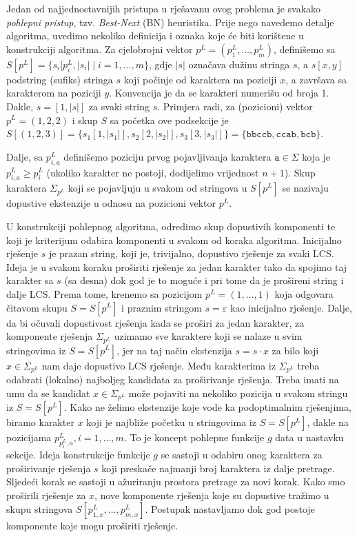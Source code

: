 \documentclass[a4paper, utf8, 11pt, colorlinks]{article}
\begin{document}
Jedan od najjednostavnijih pristupa u rješavanu ovog problema je svakako \emph{pohlepni pristup}, tzv. \emph{Best-Next} (BN) heuristika. Prije nego navedemo detalje algoritma, uvedimo nekoliko definicija i oznaka koje će biti korištene u konstrukciji algoritma. Za cjelobrojni vektor $p^L = (p^L_1,\ldots, p^L_m)$, definišemo sa
$S[p^L] = \{s_i[p^L_i, |s_i| \mid i=1,\ldots,m\}$, gdje $|s|$ označava dužinu stringa $s$, a $s[x,y]$ podstring (sufiks) stringa $s$ koji počinje od karaktera na poziciji $x$, a završava sa karakterom na poziciji $y$. Konvencija je da se karakteri numerišu od broja 1. Dakle, $s= [1, |s|]$ za svaki string $s$. Primjera radi, za (pozicioni) vektor $p^L=(1,2,2)$ i skup $S$ sa početka ove podsekcije je $S[ (1,2,3)] = \{ s_1[1, |s_1|], s_2[2, |s_2|], s_3[3, |s_3|]  \}= \{ \texttt{bbccb}, \texttt{ccab}, \texttt{bcb}\}$. 
 
Dalje, sa $p^L_{i,a}$ definišemo poziciju prvog pojavljivanja karaktera $\texttt{a}\in \Sigma$ koja je  $p^L_{i,a} \geq p^L_i$ (ukoliko karakter ne postoji, dodijelimo vrijednost $n+1$). Skup karaktera $\Sigma_{p^L}$ koji se pojavljuju u svakom od stringova u $S[p^L]$ se nazivaju dopustive ekstenzije u odnosu na pozicioni vektor $p^L$. 

U konstrukciji pohlepnog algoritma, odredimo  skup dopustivih komponenti te koji je kriterijum odabira komponenti u svakom od koraka algoritma. Inicijalno rješenje $s$ je prazan string, koji je, trivijalno, dopustivo rješenje za svaki LCS. Ideja je u svakom koraku proširiti rješenje za jedan karakter tako da spojimo taj karakter sa $s$ (sa desna) dok god je to moguće i pri tome da je prošireni string i dalje LCS. Prema tome, krenemo sa pozicijom $p^L = (1, \ldots, 1)$ koja odgovara čitavom skupu $S=S[p^L]$ i praznim stringom $s =\varepsilon$ kao inicijalno rješenje. Dalje, da bi očuvali dopustivost rješenja kada se proširi za jedan karakter, za komponente rješenja $\Sigma_{p^L}$ uzimamo sve karaktere koji se nalaze u svim stringovima iz $S=S[p^L]$, jer na taj način  ekstenzija $s = s \cdot x$ za bilo koji $x \in \Sigma_{p^L}$ nam daje dopustivo LCS rješenje. Među karakterima iz $\Sigma_{p^L}$ treba odabrati (lokalno) najboljeg kandidata za proširivanje rješenja. Treba imati na umu da se kandidat $x\in \Sigma_{p^L}$ može pojaviti na nekoliko pozicija u svakom stringu iz $S=S[p^L]$. Kako ne želimo ekstenzije koje vode ka podoptimalnim rješenjima, biramo karakter $x$ koji je najbliže početku u stringovima iz $S=S[p^L]$, dakle na pozicijama $p^L_{p^L_{i},a},i=1,\ldots,m$. 
To je koncept pohlepne funkcije $g$ data u nastavku sekcije. Ideja konstrukcije funkcije $g$ se sastoji u odabiru onog karaktera za proširivanje rješenja $s$ koji preskače najmanji broj karaktera iz dalje pretrage. Sljedeći korak se sastoji u ažuriranju prostora pretrage za novi korak. Kako smo proširili rješenje za $x$, nove komponente rješenja koje su dopustive tražimo u skupu stringova $S[p^L_{1,x},\ldots, p^L_{m, x}]$. Postupak nastavljamo dok god postoje komponente koje mogu proširiti rješenje. 
\end{document}
